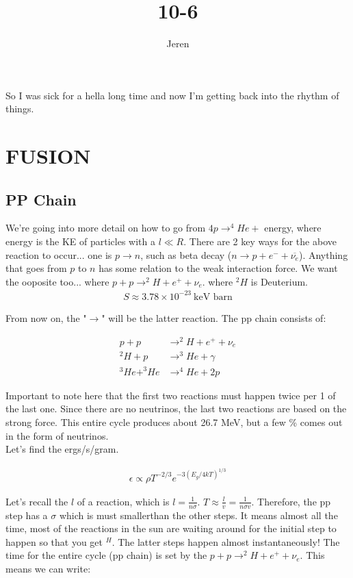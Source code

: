 \documentclass[10pt,a4paper]{article}
\author{Jeren}
\title{10-6}
\begin{document}
So I was sick for a hella long time and now I'm getting back into the rhythm of things.\\
\section{FUSION}
\subsection{PP Chain}
We're going into more detail on how to go from $4p \rightarrow ^4 He +$ energy, where energy is the KE of particles with a $l \ll R$. There are 2 key ways for the above reaction to occur... one is $p \rightarrow n$, such as beta decay ($n \rightarrow p + e^- + \overline{\nu_e}$). Anything that goes from $ p$ to $n$ has some relation to the weak interaction force. We want the ooposite too... where $p + p \rightarrow ^2H + e^+ + \nu_e$. where $^2H$ is Deuterium. 
\begin{align}
S \approx 3.78 \times 10^{-23}~\text{keV barn}
\end{align}

From now on, the "$\rightarrow$" will be the latter reaction. The pp chain consists of:

\begin{align}
p + p &\rightarrow ^2H + e^+ + \nu_e\\
^2H + p &\rightarrow ^3He + \gamma\\
^3He + ^3He &\rightarrow ^4He + 2p
\end{align}

Important to note here that the first two reactions must happen twice per 1 of the last one. Since there are no neutrinos, the last two reactions are based on the strong force. This entire cycle produces about 26.7 MeV, but a few \% comes out in the form of neutrinos. \\
Let's find the ergs/s/gram.

\begin{align}
\epsilon \propto \rho T^{-2/3}e^{-3(E_g/4kT)^{1/3}}
\end{align}

Let's recall the $l$ of a reaction, which is $l=\frac{1}{n\sigma}$. $T \approx \frac{l}{v} = \frac{1}{n \sigma v}$. Therefore, the pp step has a $\sigma$ which is must smallerthan the other steps. It means almost all the time, most of the reactions in the sun are waiting around for the initial step to happen so that you get $^H$. The latter steps happen almost instantaneously! The time for the entire cycle (pp chain) is set by the $p + p \rightarrow ^2H + e^+ + \nu_e$. This means we can write:
\end{document}
